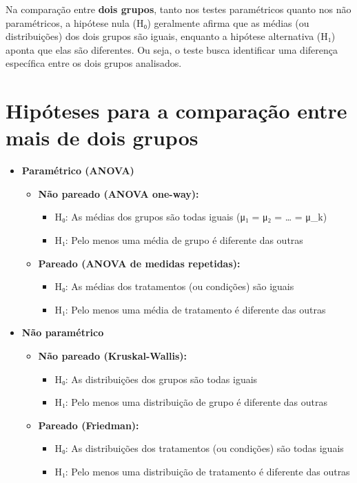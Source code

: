 \documentclass[
]{book}
\providecommand{\tightlist}{%
  \setlength{\itemsep}{0pt}\setlength{\parskip}{0pt}}
\begin{document}
Na comparação entre \textbf{dois grupos}, tanto nos testes paramétricos quanto nos não paramétricos, a hipótese nula (H₀) geralmente afirma que as médias (ou distribuições) dos dois grupos são iguais, enquanto a hipótese alternativa (H₁) aponta que elas são diferentes. Ou seja, o teste busca identificar uma diferença específica entre os dois grupos analisados.

\section{Hipóteses para a comparação entre mais de dois grupos}\label{hipuxf3teses-para-a-comparauxe7uxe3o-entre-mais-de-dois-grupos}

\begin{itemize}
\tightlist
\item
  \textbf{Paramétrico (ANOVA)}

  \begin{itemize}
  \tightlist
  \item
    \textbf{Não pareado (ANOVA one-way):}

    \begin{itemize}
    \tightlist
    \item
      H₀: As médias dos grupos são todas iguais (μ₁ = μ₂ = \ldots{} = μ\_k)
    \item
      H₁: Pelo menos uma média de grupo é diferente das outras
    \end{itemize}
  \item
    \textbf{Pareado (ANOVA de medidas repetidas):}

    \begin{itemize}
    \tightlist
    \item
      H₀: As médias dos tratamentos (ou condições) são iguais
    \item
      H₁: Pelo menos uma média de tratamento é diferente das outras
    \end{itemize}
  \end{itemize}
\item
  \textbf{Não paramétrico}

  \begin{itemize}
  \tightlist
  \item
    \textbf{Não pareado (Kruskal-Wallis):}

    \begin{itemize}
    \tightlist
    \item
      H₀: As distribuições dos grupos são todas iguais
    \item
      H₁: Pelo menos uma distribuição de grupo é diferente das outras
    \end{itemize}
  \item
    \textbf{Pareado (Friedman):}

    \begin{itemize}
    \tightlist
    \item
      H₀: As distribuições dos tratamentos (ou condições) são todas iguais
    \item
      H₁: Pelo menos uma distribuição de tratamento é diferente das outras
    \end{itemize}
  \end{itemize}
\end{itemize}
\end{document}

